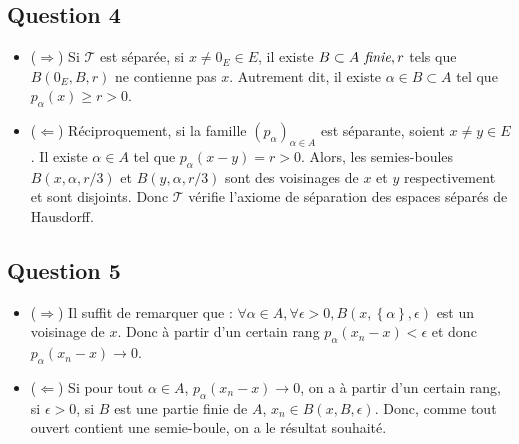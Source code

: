 \documentclass{cours}
\begin{document}
        \subsection{Question 4}
            \begin{itemize}
                \item ($\Rightarrow$) Si $\mathcal{T}$ est séparée, si $x \neq 0_{E} \in E$, il existe $B \subset A \emph{ finie}, r$ tels que $B(0_{E}, B, r)$ ne contienne pas $x$. Autrement dit, il existe $\alpha \in B \subset A$ tel que $p_{\alpha}(x) \geq r > 0$.
                \item ($\Leftarrow$) Réciproquement, si la famille $\left(p_{\alpha}\right)_{\alpha \in A}$ est séparante, soient $x \neq y \in E$. Il existe $\alpha \in A$ tel que $p_{\alpha}(x-y) = r > 0$. Alors, les semies-boules $B(x, {\alpha}, r/3)$ et $B(y, {\alpha}, r/3)$ sont des voisinages de $x$ et $y$ respectivement et sont disjoints. Donc $\mathcal{T}$ vérifie l'axiome de séparation des espaces séparés de Hausdorff.
            \end{itemize}

        \subsection{Question 5}
            \begin{itemize}
                \item ($\Rightarrow$) Il suffit de remarquer que : $\forall \alpha \in A, \forall \epsilon > 0, B(x, \left\{\alpha\right\}, \epsilon)$ est un voisinage de $x$. Donc à partir d'un certain rang $p_{\alpha}(x_{n} - x) < \epsilon$ et donc $p_{\alpha}(x_{n} - x) \to 0$.
                \item ($\Leftarrow$) Si pour tout $\alpha \in A$, $p_{\alpha}(x_{n} - x) \to 0$, on a à partir d'un certain rang, si $\epsilon > 0$, si $B$ est une partie finie de $A$, $x_{n} \in B(x, B, \epsilon)$. Donc, comme tout ouvert contient une semie-boule, on a le résultat souhaité. 
            \end{itemize}
        
\end{document}
